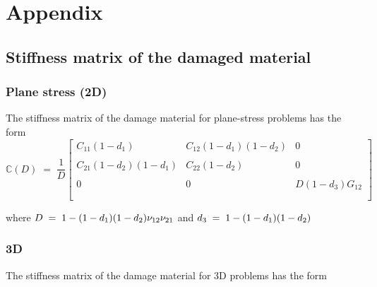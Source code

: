 \documentclass[12pt,a4paper,twoside,openright]{report}
\let\tmp\oddsidemargin
\let\oddsidemargin\evensidemargin
\let\evensidemargin\tmp
\newcounter{savepage}
\begin{document}
\clearpage
\thispagestyle{empty}
\hfill
\clearpage
	\let\tmp\oddsidemargin
	\let\oddsidemargin\evensidemargin
	\let\evensidemargin\tmp
	\reversemarginpar
{}
\chapter*{Appendix}

\renewcommand{\thesection}{\Alph{section}}
\setcounter{page}{\thesavepage}
\section{Stiffness matrix of the damaged material}\label{Stiffness matrix of the damaged material}
\subsection*{Plane stress (2D)}
The stiffness matrix of the damage material for plane-stress problems has the form \\

\begin{equation*}
\mathbb{C}(D) \; = \; \frac{1}{D}
 \begin{bmatrix}
  C_{11}(1 - d_{1}) & C_{12}(1 - d_{1})(1 - d_{2})  & 0 \\
  \\
  C_{21}(1 - d_{2})(1 - d_{1}) & C_{22}(1 - d_{2}) & 0 \\
 \\  
  0 & 0 &  D(1 - d_{3})G_{12} \\
  \\
 \end{bmatrix}
\end{equation*}

where $\mathlarger{D \; = \; 1 - (1 - d_{1})(1 - d_{2}) \nu_{12}\nu_{21}}$ and $\mathlarger{d_{3} \; = \; 1 - (1 - d_{1})(1 - d_{2}) }$



\subsection*{3D}
The stiffness matrix of the damage material for 3D problems has the form \\
\end{document}

